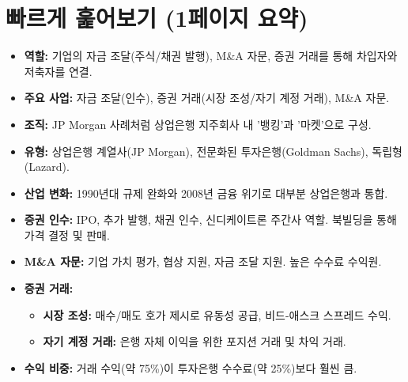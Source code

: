\documentclass[11pt,a4paper]{article}
\begin{document}
\newpage
\section*{빠르게 훑어보기 (1페이지 요약)}

\begin{tcolorbox}[title=\textbf{투자은행의 역할과 조직}]
\begin{itemize}
    \item \textbf{역할:} 기업의 자금 조달(주식/채권 발행), M\&A 자문, 증권 거래를 통해 차입자와 저축자를 연결.
    \item \textbf{주요 사업:} 자금 조달(인수), 증권 거래(시장 조성/자기 계정 거래), M\&A 자문.
    \item \textbf{조직:} JP Morgan 사례처럼 상업은행 지주회사 내 '뱅킹'과 '마켓'으로 구성.
    \item \textbf{유형:} 상업은행 계열사(JP Morgan), 전문화된 투자은행(Goldman Sachs), 독립형(Lazard).
    \item \textbf{산업 변화:} 1990년대 규제 완화와 2008년 금융 위기로 대부분 상업은행과 통합.
\end{itemize}
\end{tcolorbox}

\begin{tcolorbox}[title=\textbf{투자은행 활동의 세부 사항}]
\begin{itemize}
    \item \textbf{증권 인수:} IPO, 추가 발행, 채권 인수, 신디케이트론 주간사 역할. 북빌딩을 통해 가격 결정 및 판매.
    \item \textbf{M\&A 자문:} 기업 가치 평가, 협상 지원, 자금 조달 지원. 높은 수수료 수익원.
    \item \textbf{증권 거래:}
    \begin{itemize}
        \item \textbf{시장 조성:} 매수/매도 호가 제시로 유동성 공급, 비드-애스크 스프레드 수익.
        \item \textbf{자기 계정 거래:} 은행 자체 이익을 위한 포지션 거래 및 차익 거래.
    \end{itemize}
    \item \textbf{수익 비중:} 거래 수익(약 75\%)이 투자은행 수수료(약 25\%)보다 훨씬 큼.
\end{itemize}
\end{tcolorbox}
\end{document}
